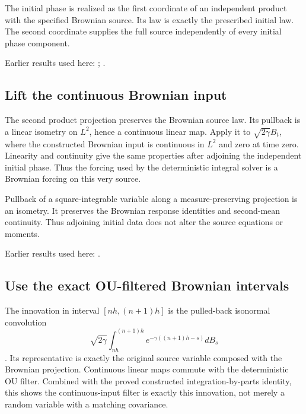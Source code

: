 \documentclass[11pt,a4paper]{report}
\begin{document}
The initial phase is realized as the first coordinate of an independent product with the specified Brownian source. Its law is exactly the prescribed initial law. The second coordinate supplies the full source independently of every initial phase component.



Earlier results used here: \cite[Section~3.8.16]{LangevinLean2026ULASC}; \cite[Section~3.8.17]{LangevinLean2026ULASC}.
\subsection{\texorpdfstring{Lift the continuous Brownian input}{Lift the continuous Brownian input}}
\label{report-step-KineticLangevin-CanonicalProduct-lean-2}


The second product projection preserves the Brownian source law. Its pullback is a linear isometry on \(L^{2}\), hence a continuous linear map. Apply it to \(\sqrt{2\gamma}B_t\), where the constructed Brownian input is continuous in \(L^{2}\) and zero at time zero. Linearity and continuity give the same properties after adjoining the independent initial phase. Thus the forcing used by the deterministic integral solver is a Brownian forcing on this very source.



Pullback of a square-integrable variable along a measure-preserving projection is an isometry. It preserves the Brownian response identities and second-mean continuity. Thus adjoining initial data does not alter the source equations or moments.



Earlier results used here: \cite[Section~3.8.17]{LangevinLean2026ULASC}.
\subsection{\texorpdfstring{Use the exact OU-filtered Brownian intervals}{Use the exact OU-filtered Brownian intervals}}
\label{report-step-KineticLangevin-CanonicalProduct-lean-3}


The innovation in interval \([nh,(n+1)h]\) is the pulled-back isonormal convolution
\[\sqrt{2\gamma}\int_{nh}^{(n+1)h}e^{-\gamma((n+1)h-s)}dB_s\]
. Its representative is exactly the original source variable composed with the Brownian projection. Continuous linear maps commute with the deterministic OU filter. Combined with the proved constructed integration-by-parts identity, this shows the continuous-input filter is exactly this innovation, not merely a random variable with a matching covariance.
\end{document}
